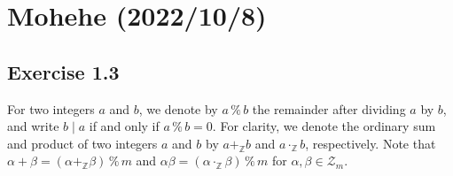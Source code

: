 \documentclass{article}
\newcommand\Z{\mathbb Z}
\begin{document}
\section{Mohehe (2022/10/8)}
\subsection{Exercise 1.3}
\newcommand\rem{\mathbin\%} %
\newcommand\Zm{\mathcal Z_m} %
For two integers $a$ and $b$,
we denote by $a \rem b$ the remainder after dividing $a$ by $b$,
and write $b \mid a$ if and only if $a \rem b = 0$.
For clarity,
we denote the ordinary sum and product of two integers $a$ and $b$
by $a +_\Z b$ and $a \cdot_\Z b$, respectively.
Note that $\alpha + \beta = (\alpha +_\Z \beta) \rem m$
and $\alpha\beta = (\alpha \cdot_\Z \beta) \rem m$
for $\alpha, \beta \in \Zm$.
\end{document}
